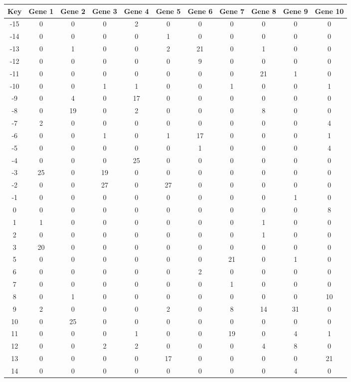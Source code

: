 \begin{tabular}{|c|c|c|c|c|c|c|c|c|c|c|}
\hline
Key & Gene 1 & Gene 2 & Gene 3 & Gene 4 & Gene 5 & Gene 6 & Gene 7 & Gene 8 & Gene 9 & Gene 10 \\
\hline
-15 & 0 & 0 & 0 & 2 & 0 & 0 & 0 & 0 & 0 & 0 \\
-14 & 0 & 0 & 0 & 0 & 1 & 0 & 0 & 0 & 0 & 0 \\
-13 & 0 & 1 & 0 & 0 & 2 & 21 & 0 & 1 & 0 & 0 \\
-12 & 0 & 0 & 0 & 0 & 0 & 9 & 0 & 0 & 0 & 0 \\
-11 & 0 & 0 & 0 & 0 & 0 & 0 & 0 & 21 & 1 & 0 \\
-10 & 0 & 0 & 1 & 1 & 0 & 0 & 1 & 0 & 0 & 1 \\
-9 & 0 & 4 & 0 & 17 & 0 & 0 & 0 & 0 & 0 & 0 \\
-8 & 0 & 19 & 0 & 2 & 0 & 0 & 0 & 8 & 0 & 0 \\
-7 & 2 & 0 & 0 & 0 & 0 & 0 & 0 & 0 & 0 & 4 \\
-6 & 0 & 0 & 1 & 0 & 1 & 17 & 0 & 0 & 0 & 1 \\
-5 & 0 & 0 & 0 & 0 & 0 & 1 & 0 & 0 & 0 & 4 \\
-4 & 0 & 0 & 0 & 25 & 0 & 0 & 0 & 0 & 0 & 0 \\
-3 & 25 & 0 & 19 & 0 & 0 & 0 & 0 & 0 & 0 & 0 \\
-2 & 0 & 0 & 27 & 0 & 27 & 0 & 0 & 0 & 0 & 0 \\
-1 & 0 & 0 & 0 & 0 & 0 & 0 & 0 & 0 & 1 & 0 \\
0 & 0 & 0 & 0 & 0 & 0 & 0 & 0 & 0 & 0 & 8 \\
1 & 1 & 0 & 0 & 0 & 0 & 0 & 0 & 1 & 0 & 0 \\
2 & 0 & 0 & 0 & 0 & 0 & 0 & 0 & 1 & 0 & 0 \\
3 & 20 & 0 & 0 & 0 & 0 & 0 & 0 & 0 & 0 & 0 \\
5 & 0 & 0 & 0 & 0 & 0 & 0 & 21 & 0 & 1 & 0 \\
6 & 0 & 0 & 0 & 0 & 0 & 2 & 0 & 0 & 0 & 0 \\
7 & 0 & 0 & 0 & 0 & 0 & 0 & 1 & 0 & 0 & 0 \\
8 & 0 & 1 & 0 & 0 & 0 & 0 & 0 & 0 & 0 & 10 \\
9 & 2 & 0 & 0 & 0 & 2 & 0 & 8 & 14 & 31 & 0 \\
10 & 0 & 25 & 0 & 0 & 0 & 0 & 0 & 0 & 0 & 0 \\
11 & 0 & 0 & 0 & 1 & 0 & 0 & 19 & 0 & 4 & 1 \\
12 & 0 & 0 & 2 & 2 & 0 & 0 & 0 & 4 & 8 & 0 \\
13 & 0 & 0 & 0 & 0 & 17 & 0 & 0 & 0 & 0 & 21 \\
14 & 0 & 0 & 0 & 0 & 0 & 0 & 0 & 0 & 4 & 0 \\
\hline
\end{tabular}